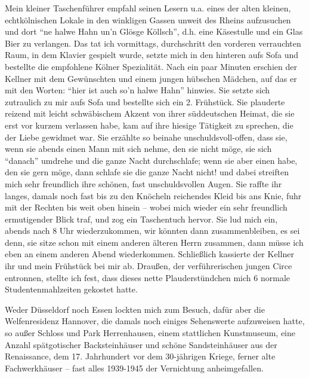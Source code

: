 \documentclass[a5paper,pagesize,10pt,twoside=true]{scrbook}
\renewcommand{\marginpar}[2][]{}
\begin{document}
\marginpar{140}
Mein kleiner Taschenführer empfahl seinen Lesern u.a. eines der alten kleinen, echtkölnischen Lokale in den winkligen Gassen unweit des Rheins aufzusuchen und dort \enquote{ne halwe Hahn un'n Glösge Köllsch}, d.h. eine Käsestulle und ein Glas Bier zu verlangen. Das tat ich vormittags, durchschritt den vorderen verrauchten Raum, in dem Klavier gespielt wurde, setzte mich in den hinteren aufs Sofa und bestellte die empfohlene Kölner Spezialität. Nach ein paar Minuten erschien der Kellner mit dem Gewünschten und einem jungen hübschen Mädchen, auf das er mit den Worten: \enquote{hier ist auch so'n halwe Hahn} hinwies. Sie setzte sich zutraulich zu mir aufs Sofa und bestellte sich ein 2. Frühstück. Sie plauderte reizend mit leicht schwäbischem Akzent von ihrer süddeutschen Heimat, die sie erst vor kurzem verlassen habe, kam auf ihre hiesige Tätigkeit zu sprechen, die der Liebe gewidmet war. Sie erzählte so beinahe unschuldsvoll-offen, dass sie, wenn sie abends einen Mann mit sich nehme, den sie nicht möge, sie sich \enquote{danach} umdrehe und die ganze Nacht durchschlafe; wenn sie aber einen habe, den sie gern möge, dann schlafe sie die ganze Nacht nicht! und dabei streiften mich sehr freundlich ihre schönen, fast unschuldsvollen Augen. Sie raffte ihr langes, damals noch fast bis zu den Knöcheln reichendes Kleid bis ans Knie, fuhr mit der Rechten bis weit oben hinein -- wobei mich wieder ein sehr freundlich ermutigender Blick traf, und zog ein Taschentuch hervor. Sie lud mich ein, abends nach 8 Uhr wiederzukommen, wir könnten dann zusammenbleiben, es sei denn, sie sitze schon mit einem anderen älteren Herrn zusammen, dann müsse ich eben an einem anderen Abend wiederkommen. Schließlich kassierte der Kellner ihr und mein Frühstück bei mir ab. Draußen, der verführerischen jungen Circe entronnen, stellte ich fest, dass dieses nette Plauderstündchen mich 6 normale Studentenmahlzeiten gekostet hatte.

\marginpar{142}
Weder Düsseldorf noch Essen lockten mich zum Besuch, dafür aber die Welfenresidenz Hannover, die damals noch einiges Sehenswerte aufzuweisen hatte, so außer Schloss und Park Herrenhausen, einem stattlichen Kunstmuseum, eine Anzahl spätgotischer Backsteinhäuser und schöne Sandsteinhäuser aus der Renaissance, dem 17. Jahrhundert vor dem 30-jährigen Kriege, ferner alte Fachwerkhäuser -- fast alles 1939-1945 der Vernichtung anheimgefallen.
\end{document}
